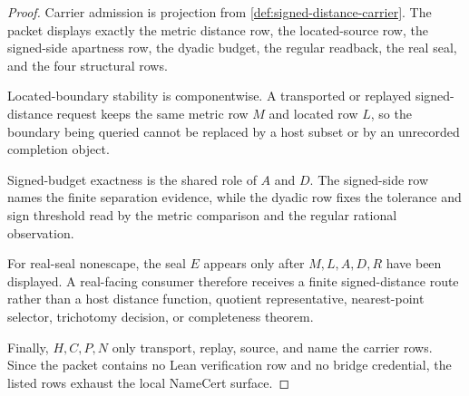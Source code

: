 \begin{proof}
Carrier admission is projection from \autoref{def:signed-distance-carrier}. The packet displays exactly the metric distance row, the located-source row, the signed-side apartness row, the dyadic budget, the regular readback, the real seal, and the four structural rows.

Located-boundary stability is componentwise. A transported or replayed signed-distance request keeps the same metric row $M$ and located row $L$, so the boundary being queried cannot be replaced by a host subset or by an unrecorded completion object.

Signed-budget exactness is the shared role of $A$ and $D$. The signed-side row names the finite separation evidence, while the dyadic row fixes the tolerance and sign threshold read by the metric comparison and the regular rational observation.

For real-seal nonescape, the seal $E$ appears only after $M,L,A,D,R$ have been displayed. A real-facing consumer therefore receives a finite signed-distance route rather than a host distance function, quotient representative, nearest-point selector, trichotomy decision, or completeness theorem.

Finally, $H,C,P,N$ only transport, replay, source, and name the carrier rows. Since the packet contains no Lean verification row and no bridge credential, the listed rows exhaust the local NameCert surface.
\end{proof}

